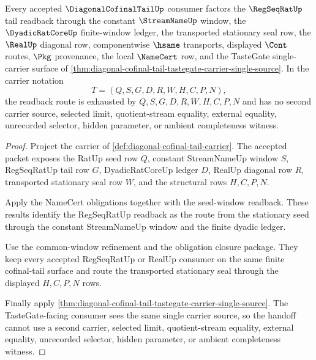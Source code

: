 \begin{theorem}
\label{thm:diagonal-cofinal-tail-regseqrat-streamname-handoff}
Every accepted $\DiagonalCofinalTailUp$ consumer factors the
$\RegSeqRatUp$ tail readback through the constant $\StreamNameUp$ window,
the $\DyadicRatCoreUp$ finite-window ledger, the transported stationary seal
row, the $\RealUp$ diagonal row, componentwise $\hsame$ transports,
displayed $\Cont$ routes, $\Pkg$ provenance, the local $\NameCert$ row, and
the TasteGate single-carrier surface of
\autoref{thm:diagonal-cofinal-tail-tastegate-carrier-single-source}. In the
carrier notation
$$
T=(Q,S,G,D,R,W,H,C,P,N),
$$
the readback route is exhausted by $Q,S,G,D,R,W,H,C,P,N$ and has no second
carrier source, selected limit, quotient-stream equality, external equality,
unrecorded selector, hidden parameter, or ambient completeness witness.
\end{theorem}
\begin{proof}
Project the carrier of \autoref{def:diagonal-cofinal-tail-carrier}. The
accepted packet exposes the RatUp seed row $Q$, constant StreamNameUp window
$S$, RegSeqRatUp tail row $G$, DyadicRatCoreUp ledger $D$, RealUp diagonal
row $R$, transported stationary seal row $W$, and the structural rows
$H,C,P,N$.

Apply the NameCert obligations together with the seed-window readback. These
results identify the RegSeqRatUp readback as the route from the stationary
seed through the constant StreamNameUp window and the finite dyadic ledger.

Use the common-window refinement and the obligation closure package. They
keep every accepted RegSeqRatUp or RealUp consumer on the same finite
cofinal-tail surface and route the transported stationary seal through the
displayed $H,C,P,N$ rows.

Finally apply
\autoref{thm:diagonal-cofinal-tail-tastegate-carrier-single-source}. The
TasteGate-facing consumer sees the same single carrier source, so the handoff
cannot use a second carrier, selected limit, quotient-stream equality,
external equality, unrecorded selector, hidden parameter, or ambient
completeness witness.
\end{proof}


